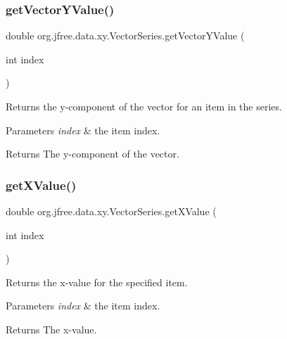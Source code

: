 \subsubsection{\texorpdfstring{get\+Vector\+Y\+Value()}{getVectorYValue()}}
{\footnotesize\ttfamily double org.\+jfree.\+data.\+xy.\+Vector\+Series.\+get\+Vector\+Y\+Value (\begin{DoxyParamCaption}\item[{int}]{index }\end{DoxyParamCaption})}

Returns the y-\/component of the vector for an item in the series.


\begin{DoxyParams}{Parameters}
{\em index} & the item index.\\
\hline
\end{DoxyParams}
\begin{DoxyReturn}{Returns}
The y-\/component of the vector. 
\end{DoxyReturn}
\mbox{\label{classorg_1_1jfree_1_1data_1_1xy_1_1_vector_series_a332b301b787037795ade0d6f619e1dda}} 
\subsubsection{\texorpdfstring{get\+X\+Value()}{getXValue()}}
{\footnotesize\ttfamily double org.\+jfree.\+data.\+xy.\+Vector\+Series.\+get\+X\+Value (\begin{DoxyParamCaption}\item[{int}]{index }\end{DoxyParamCaption})}

Returns the x-\/value for the specified item.


\begin{DoxyParams}{Parameters}
{\em index} & the item index.\\
\hline
\end{DoxyParams}
\begin{DoxyReturn}{Returns}
The x-\/value. 
\end{DoxyReturn}
\mbox{\label{classorg_1_1jfree_1_1data_1_1xy_1_1_vector_series_a4d67a2291d74f07835369d579fc6909e}} 
